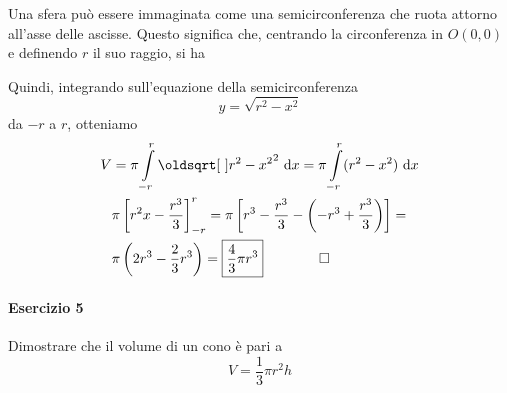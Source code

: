 Una sfera può essere immaginata come una semicirconferenza che ruota attorno all'asse delle 
ascisse. Questo significa che, centrando la circonferenza in $O(0,0)$ e definendo $r$ il suo
raggio, si ha
\begin{center}
\end{center}
Quindi, integrando sull'equazione della semicirconferenza
\begin{equation*}
  y = \sqrt{r^2-x^2}
\end{equation*}
da $-r$ a $r$, otteniamo
\begin{align*}
  V &= \pi\int\limits_{-r}^{r} \sqrt{r^2-x^2}^2 \,\dif x =
  \pi \int\limits_{-r}^{r} (r^2-x^2)\,\dif x\\
  &\pi \left[ r^2x-\frac{r^3}{3} \right]_{-r}^r=
  \pi \left[ r^3-\frac{r^3}{3}-\left( -r^3+\frac{r^3}{3} \right) \right]=\\
  &\pi \left( 2r^3-\frac{2}{3}r^3 \right) = \boxed{\frac{4}{3}\pi r^3}\qquad\qed
\end{align*}

\paragraph{Esercizio 5}
Dimostrare che il volume di un cono è pari a
\begin{equation*}
  V = \frac{1}{3}\pi r^2h
\end{equation*}
\divisor

